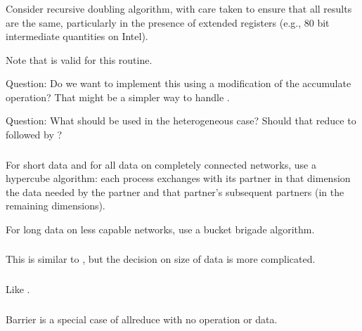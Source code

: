 \documentclass{article}
\begin{document}
\subsubsection{}
Consider recursive doubling algorithm, with care taken to ensure that all
results are the same, particularly in the presence of extended registers
(e.g., 80 bit intermediate quantities on Intel).

Note that  is valid for this routine. 

Question: Do we want to implement this using a modification of the accumulate
operation?  That might be a simpler way to handle .

Question: What should be used in the heterogeneous case?  Should that
reduce to  followed by ?

\subsubsection{}
For short data and for all data on completely connected networks, use a
hypercube algorithm: each process exchanges with its partner in that dimension
the data needed by the partner and that partner's subsequent partners (in the
remaining dimensions).

For long data on less capable networks, use a bucket brigade algorithm.

\subsubsection{}
This is similar to , but the decision on size of data is
more complicated.  

\subsubsection{}
Like .

\subsubsection{}
Barrier is a special case of allreduce with no operation or data.
\end{document}
